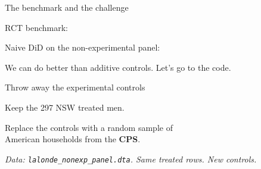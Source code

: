 \documentclass[11pt,aspectratio=169]{beamer}
\begin{document}
\begin{frame}{The benchmark and the challenge}
\vspace{1em}
\begin{center}
\Large
RCT benchmark: \;
\end{center}
\vspace{0.6em}
\begin{center}
\Large
Naive DiD on the non-experimental panel: \;
\end{center}
\vspace{0.8em}
\begin{center}
\large
We can do better than additive controls. \;Let's go to the code.
\end{center}
\end{frame}


\begin{frame}{Throw away the experimental controls}
\vspace{1em}
\begin{center}
\large
Keep the 297 NSW treated men.
\end{center}
\vspace{0.6em}
\begin{center}
\large
Replace the controls with a random sample of \\[0.2em] American households from the \textbf{CPS}.
\end{center}
\vspace{1em}
\begin{center}
\small\color{warmgray}\itshape
Data: \texttt{lalonde\_nonexp\_panel.dta}. \;Same treated rows. \;New controls.
\end{center}
\end{frame}
\end{document}
